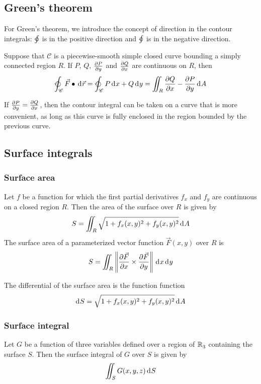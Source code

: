 \documentclass[10pt, twocolumn]{article}
\theoremstyle{remark}
\begin{document}
\subsection{Green's theorem}
For Green's theorem, we introduce the concept of direction in the contour integrals: \(\varointctrclockwise\) is in the positive direction and \(\ointclockwise\) is in the negative direction.

Suppose that \(\mathscr{C}\) is a piecewise-smooth simple closed curve bounding a simply connected region \(R\).
If \(P\), \(Q\), \(\frac{\partial P}{\partial y}\) and \(\frac{\partial Q}{\partial x}\) are continuous on \(R\), then
\[
  \varointctrclockwise_{\mathscr{C}}{\vec{F} \bullet \diffint{\vec{r}}} = \varointctrclockwise_{\mathscr{C}}{P \diffint{x} + Q \diffint{y}} = \iint_R {\partialderivative{Q}{x} - \partialderivative{P}{y} \diffint{A}}
\]

If \(\frac{\partial P}{\partial y} = \frac{\partial Q}{\partial x}\), then the contour integral can be taken on a curve that is more convenient, as long as this curve is fully enclosed in the region bounded by the previous curve.

\subsection{Surface integrals}
\subsubsection*{Surface area}
Let \(f\) be a function for which the first partial derivatives \(f_x \) and \(f_y \) are continuous on a closed region \(R\).
Then the area of the surface over \(R\) is given by
\[
  S = \iint_R {\sqrt{1 + f_x (x, y)^2 + f_y (x, y)^2 }\,\mathrm{d}^{} A}
\]
The surface area of a parameterized vector function \(\vec{F}(x, y)\) over \(R\) is
\[
  S = \iint_R {\left\| \frac{\partial \vec{F}}{\partial x} \times \frac{\partial \vec{F}}{\partial y} \right\|\,\mathrm{d}^{} x\,\mathrm{d}^{} y}
\]

The differential of the surface area is the function function
\[
  \mathrm{d}^{} S = \sqrt{1 + f_x (x, y)^2 + f_y (x, y)^2 }\,\mathrm{d}^{} A
\]

\subsubsection*{Surface integral}
Let \(G\) be a function of three variables defined over a region of \(\mathbb{R}_{3}^{}\) containing the surface \(S\).
Then the surface integral of \(G\) over \(S\) is given by
\[
  \iint_S {G(x, y, z)\,\mathrm{d}^{} S}
\]
\end{document}
